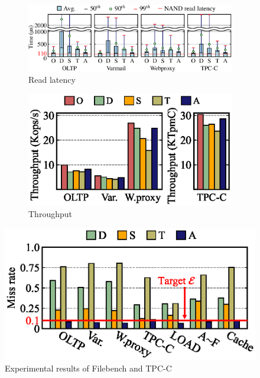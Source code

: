 \begin{figure}[t]
	\begin{minipage}[c]{0.71\textwidth}
        \begin{subfigure}[b]{0.64\textwidth}
            \centering
            \includegraphics[width=\textwidth]{exp/filesystem/fs-latency.eps}
            \vspace{-10pt}
   	        \caption{Read latency}
            \label{fig:swap-latency}
        \end{subfigure}
        \begin{subfigure}[b]{0.345\textwidth}
            \centering
            \includegraphics[width=\textwidth]{exp/filesystem/final-fs-throughput.eps}
            \vspace{-5pt}
            \caption{Throughput} 
            \label{fig:swap-throughput}
        \end{subfigure}
        \vspace{-7pt}
	    \caption{Experimental results of Filebench and TPC-C}
	    \vspace{-10pt}
	    \label{fig:exp-fs}
	\end{minipage}
    \begin{minipage}[c]{0.28\textwidth}
            \centering
            \vspace{0pt}
            \includegraphics[width=\textwidth]{exp/miss_ratio/real-final-miss-ratio.eps}

\end{minipage}
\end{figure}
